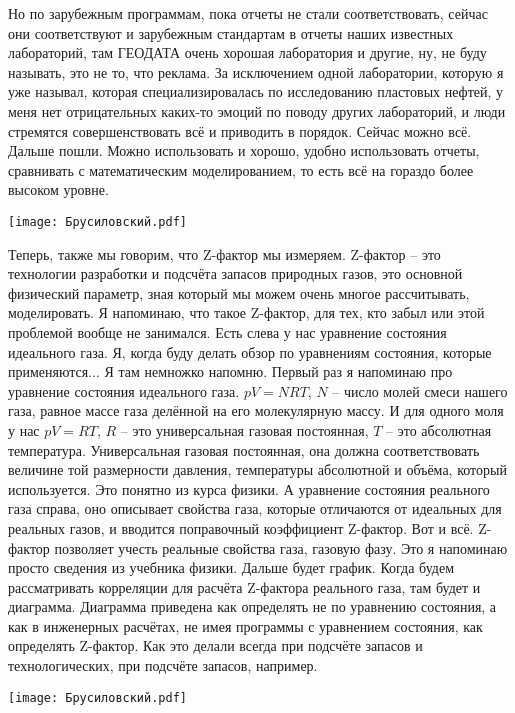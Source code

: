 \documentclass[main.tex]{subfiles}
\begin{document}
Но по зарубежным программам, пока отчеты не стали соответствовать, сейчас они соответствуют и зарубежным стандартам в отчеты наших известных лабораторий, там ГЕОДАТА очень хорошая лаборатория и другие, ну, не буду называть, это не то, что реклама.
За исключением одной лаборатории, которую я уже называл, которая специализировалась по исследованию пластовых нефтей, у меня нет отрицательных каких-то эмоций по поводу других лабораторий, и люди стремятся совершенствовать всё и приводить в порядок.
Сейчас можно всё.
Дальше пошли.
Можно использовать и хорошо, удобно использовать отчеты, сравнивать с математическим моделированием, то есть всё на гораздо более высоком уровне.

\begin{center}
\texttt{[image: Брусиловский.pdf]}
\end{center}

Теперь, также мы говорим, что Z-фактор мы измеряем.
Z-фактор -- это технологии разработки и подсчёта запасов природных газов, это основной физический параметр, зная который мы можем очень многое рассчитывать, моделировать.
Я напоминаю, что такое Z-фактор, для тех, кто забыл или этой проблемой вообще не занимался.
Есть слева у нас уравнение состояния идеального газа.
Я, когда буду делать обзор по уравнениям состояния, которые применяются...
Я там немножко напомню.
Первый раз я напоминаю про уравнение состояния идеального газа.
$pV=NRT$, $N$ -- число молей смеси нашего газа, равное массе газа делённой на его молекулярную массу.
И для одного моля у нас $pV=RT$, $R$ -- это универсальная газовая постоянная, $T$ -- это абсолютная температура.
Универсальная газовая постоянная, она должна соответствовать величине той размерности давления, температуры абсолютной и объёма, который используется.
Это понятно из курса физики.
А уравнение состояния реального газа справа, оно описывает свойства газа, которые отличаются от идеальных для реальных газов, и вводится поправочный коэффициент Z-фактор.
Вот и всё.
Z-фактор позволяет учесть реальные свойства газа, газовую фазу.
Это я напоминаю просто сведения из учебника физики.
Дальше будет график.
Когда будем рассматривать корреляции для расчёта Z-фактора реального газа, там будет и диаграмма.
Диаграмма приведена как определять не по уравнению состояния, а как в инженерных расчётах, не имея программы с уравнением состояния, как определять Z-фактор.
Как это делали всегда при подсчёте запасов и технологических, при подсчёте запасов, например.

\begin{center}
\texttt{[image: Брусиловский.pdf]}
\end{center}
\end{document}
